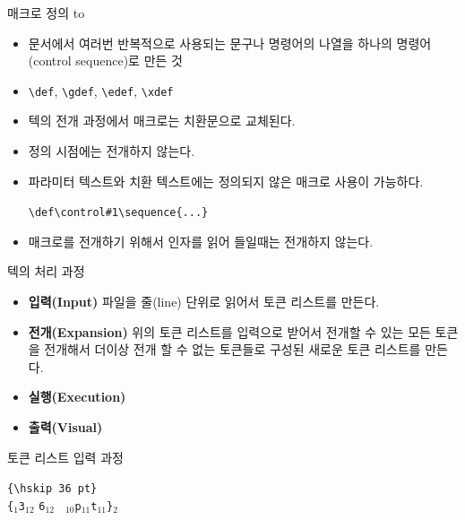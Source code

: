 \documentclass{beamer}
\begin{document}
%
\begin{frame}[fragile]{매크로 정의}
  \medskip
  \hbox to
  \smallskip
  \begin{itemize}
  \item 문서에서 여러번 반복적으로 사용되는 문구나 명령어의 나열을 하나의
    명령어(control sequence)로 만든 것
  \item \verb+\def+, \verb+\gdef+, \verb+\edef+, \verb+\xdef+
  \item 텍의 전개 과정에서 매크로는 치환문으로 교체된다.
  \item 정의 시점에는 전개하지 않는다.
  \item 파라미터 텍스트와 치환 텍스트에는 정의되지 않은 매크로 사용이 가능하다.
    
    \verb+\def\control#1\sequence{...}+
  \item 매크로를 전개하기 위해서 인자를 읽어 들일때는 전개하지 않는다.
  \end{itemize}
\end{frame}


%
\begin{frame}{텍의 처리 과정}  
  \begin{itemize}
  \item \alert{\bf 입력(Input)} 파일을 줄(line) 단위로 읽어서
    \alert{토큰 리스트}를 만든다.
  \item \alert{\bf 전개(Expansion)} 위의 토큰 리스트를 입력으로 받어서 전개할 수 있는
    모든 토큰을 전개해서 더이상 전개 할 수 없는 토큰들로 구성된 새로운 토큰 리스트를 만든다.
  \item \alert{\bf 실행(Execution)}
  \item \alert{\bf 출력(Visual)}
  \end{itemize}
\end{frame}


%
\begin{frame}[fragile]{토큰 리스트}
  \alert{입력 과정}
  
  \verb*+{\hskip 36 pt}+\\
  \bigskip
  \verb|{|$_1$\quad{}\quad\verb|3|$_{12}$
  \quad\verb|6|$_{12}$\quad
  \verb*| |$_{10}$\quad\verb|p|$_{11}$\quad\verb|t|$_{11}$\quad\verb|}|$_{2}$
\end{frame}
\end{document}
